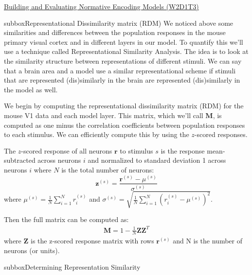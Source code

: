 \begin{textbox}{\href{https://compneuro.neuromatch.io/tutorials/W2D1_DeepLearning/student/W2D1_Tutorial3.html}{Building and Evaluating Normative Encoding Models (W2D1T3)} }
\begin{subbox}{subbox}{Representational Dissimilarity matrix (RDM)}
\scriptsize
We noticed above some similarities and differences between the population responses in the mouse primary visual cortex and in different layers in our model. To quantify this we’ll use a technique called Representational Similarity Analysis. The idea is to look at the similarity structure between representations of different stimuli. We can say that a brain area and a model use a similar representational scheme if stimuli that are represented (dis)similarly in the brain are represented (dis)similarly in the model as well.

We begin by computing the representational dissimilarity matrix (RDM) for the mouse V1 data and each model layer. This matrix, which we'll call $\mathbf{M}$, is computed as one minus the correlation coefficients between population responses to each stimulus. We can efficiently compute this by using the $z$-scored responses. 

The $z$-scored response of all neurons $\mathbf{r}$ to stimulus $s$ is the response mean-subtracted across neurons $i$ and normalized to standard deviation 1 across neurons $i$ where $N$ is the total number of neurons:
\begin{equation}
  \mathbf{z}^{(s)} = \frac{\mathbf{r}^{(s)} - \mu^{(s)}}
  {\sigma^{(s)}}
\end{equation}
where $\mu^{(s)} = \frac{1}{N}\sum_{i=1}^N r_i^{(s)}$ and 
$\sigma^{(s)} = \sqrt{\frac{1}{N}\sum_{i=1}^N \left( r_i^{(s)} - \mu^{(s)} \right)^2}$.

Then the full matrix can be computed as:
\begin{gather}
  \mathbf{M} = 1 - \frac{1}{N} \mathbf{ZZ}^T
\end{gather}
where $\mathbf{Z}$ is the z-scored response matrix with rows $\mathbf{r}^{(s)}$ and N is the number of neurons (or units).

\end{subbox}
\begin{subbox}{subbox}{Determining Representation Similarity}
\scriptsize


\end{subbox}
\end{textbox}

